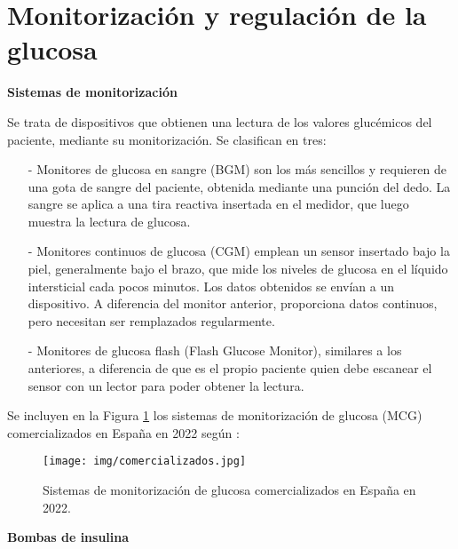 \section{Monitorización y regulación de la glucosa}

\textbf{Sistemas de monitorización }

Se trata de dispositivos que obtienen una lectura de los valores glucémicos del paciente, mediante su monitorización. Se clasifican en tres:
\begin{enumerate}
    \item[-] Monitores de glucosa en sangre (BGM) son los más sencillos y requieren de una gota de sangre del paciente, obtenida mediante una punción del dedo. La sangre se aplica a una tira reactiva insertada en el medidor, que luego muestra la lectura de glucosa. 
    \item[-] Monitores continuos de glucosa (CGM) emplean un sensor insertado bajo la piel, generalmente bajo el brazo, que mide los niveles de glucosa en el líquido intersticial cada pocos minutos. Los datos obtenidos se envían a un dispositivo. A diferencia del monitor anterior, proporciona datos continuos, pero necesitan ser remplazados regularmente. \label{sec:CGM}
    \item[-] Monitores de glucosa flash (Flash Glucose Monitor), similares a los anteriores, a diferencia de que es el propio paciente quien debe escanear el sensor con un lector para poder obtener la lectura. 
\end{enumerate}

Se incluyen en la Figura \ref{fig:sist_mon_2022} los sistemas de monitorización de glucosa  (MCG) comercializados en España en 2022 según \cite{revistadiabetes_monitorizacion_glucosa}:

\begin{figure}[h]
    \centering
    \texttt{[image: img/comercializados.jpg]}
    \caption{Sistemas de monitorización de glucosa comercializados en España en 2022.}
    \label{fig:sist_mon_2022}
\end{figure}

\textbf{Bombas de insulina} \label{sec:bomba}

